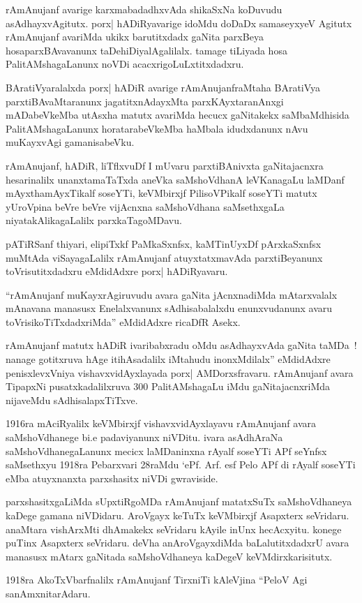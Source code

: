 rAmAnujanf avarige karxmabadadhxvAda shikaSxNa koDuvudu asAdhayxvAgitutx.
porx| hADiRyavarige idoMdu doDaDx samaseyxyeV Agitutx rAmAnujanf avariMda ukikx barutitxdadx gaNita parxBeya hosaparxBAvavanunx taDehiDiyalAgalilalx. tamage tiLiyada hosa PalitAMshagaLanunx noVDi acacxrigoLuLxtitxdadxru.

BAratiVyaralalxda porx| hADiR avarige rAmAnujanfraMtaha BAratiVya parxtiBA\-vaMtaranunx jagatitxnAdayxMta parxKAyxtaranAnxgi mADabeVkeMba utAsxha matutx avariMda hecucx gaNitakekx saMbaMdhisida PalitAMshagaLanunx horatarabeVkeMba haMbala idudxdanunx nAvu muKayxvAgi gamanisabeVku.

rAmAnujanf, hADiR, liTflxvuDf I mUvaru parxtiBAnivxta gaNitajacnxra hesarinalilx unanxtamaTaTxda aneVka saMshoVdhanA leVKanagaLu laMDanf mAyxthamAyxTikalf soseYTi, keVMbirxjf PilisoVPikalf soseYTi matutx yUroVpina beVre beVre vijAcnxna saMshoV\-dhana saMsethxgaLa niyatakAlikagaLalilx parxkaTagoMDavu.

pATiRSanf thiyari, elipiTxkf PaMkaSxnfsx, kaMTinUyxDf pArxkaSxnfsx muMtAda viSayagaLalilx rAmAnujanf atuyxtatxmavAda parxtiBeyanunx toVrisutitxdadxru eMdidAdxre porx| hADiRyavaru.

``rAmAnujanf muKayxrAgiruvudu avara gaNita jAcnxnadiMda mAtarxvalalx mAna\-vana manasusx Enelalxvanunx sAdhisabalalxdu enunxvudanunx avaru toVrisikoTiTxdadxriMda'' eMdidAdxre ricaDfR Asekx.

rAmAnujanf matutx hADiR ivaribabxradu oMdu asAdhayxvAda gaNita taMDa~! nanage gotitxruva hAge itihAsadalilx iMtahudu inonxMdilalx'' eMdidAdxre penisxlevxVniya vishavxvidAyxlayada porx| AMDorxsfravaru. rAmAnujanf avara TipapxNi pusatxkadalilxruva {\rm 300} PalitAMshagaLu iMdu gaNitajacnxriMda nijaveMdu sAdhisalapxTiTxve.

{\rm 1916}ra mAciRyalilx keVMbirxjf vishavxvidAyxlayavu rAmAnujanf avara saMshoVdha\-nege bi.e padaviyanunx niVDitu. ivara asAdhAraNa saMshoVdhanegaLanunx mecicx laMDa\-ninxna rAyalf soseYTi APf seYnfsx saMsethxyu {\rm 1918}ra Pebarxvari {\rm 28}raMdu `ePf. Arf. esf Pelo APf di rAyalf soseYTi eMba atuyxnanxta parxshasitx niVDi gwraviside.

parxshasitxgaLiMda sUpxtiRgoMDa rAmAnujanf matatxSuTx saMshoVdhaneya kaDege gamana niVDidaru. AroVgayx keTuTx keVMbirxjf Asapxterx seVridaru. anaMtara vishArxMti dhAmakekx seVridaru kAyile inUnx hecAcxyitu. konege puTinx Asapxterx seVridaru. deVha anAroVgayx\-diMda baLalutitxdadxrU avara manasusx mAtarx gaNitada saMshoVdhaneya kaDegeV keVMdirx\-karisitutx.

{\rm 1918}ra AkoTxVbarfnalilx rAmAnujanf TirxniTi kAleVjina ``PeloV Agi sanAmxnitarAdaru.

